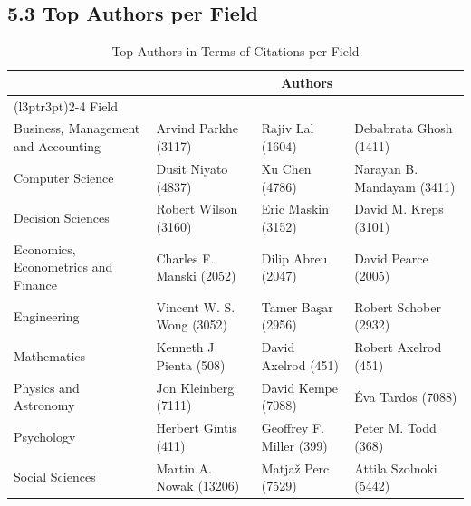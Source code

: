 \documentclass[
  12pt,
]{article}
\begin{document}
\begin{table}[H]

\caption{\label{tab:authors per domain}Top Authors in Terms of Publications per Domain}
\centering
{}
\end{table}

\newpage

\subsection{5.3 Top Authors per Field}\label{top-authors-per-field}

\begin{table}[H]

\caption{\label{tab:authors per field}Top Authors in Terms of Citations per Field}
\centering
\fontsize{8}{10}\selectfont
\begin{tabular}[t]{llll}
\toprule
\multicolumn{1}{c}{ } & \multicolumn{3}{c}{Authors} \\
\cmidrule(l{3pt}r{3pt}){2-4}
Field &  &  & \\
\midrule
Business, Management and Accounting & Arvind Parkhe (3117) & Rajiv Lal (1604) & Debabrata Ghosh (1411)\\
Computer Science & Dusit Niyato (4837) & Xu Chen (4786) & Narayan B. Mandayam (3411)\\
Decision Sciences & Robert Wilson (3160) & Eric Maskin (3152) & David M. Kreps (3101)\\
Economics, Econometrics and Finance & Charles F. Manski (2052) & Dilip Abreu (2047) & David Pearce (2005)\\
Engineering & Vincent W. S. Wong (3052) & Tamer Başar (2956) & Robert Schober (2932)\\
Mathematics & Kenneth J. Pienta (508) & David Axelrod (451) & Robert Axelrod (451)\\
Physics and Astronomy & Jon Kleinberg (7111) & David Kempe (7088) & Éva Tardos (7088)\\
Psychology & Herbert Gintis (411) & Geoffrey F. Miller (399) & Peter M. Todd (368)\\
Social Sciences & Martin A. Nowak (13206) & Matjaž Perc (7529) & Attila Szolnoki (5442)\\
\bottomrule
\end{tabular}
\end{table}
\end{document}

